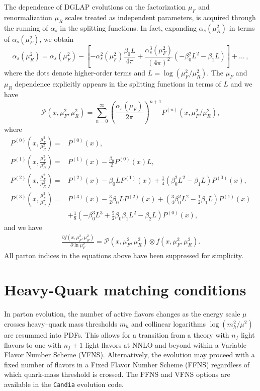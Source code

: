 \documentclass[12pt,notitlepage,aps,preprintnumbers,superscriptaddress,nofootinbib,aps,prd,floatfix]{revtex4-2}
\renewenvironment{eqnarray}{\begin{equation}\begin{aligned}}
{\end{aligned}\end{equation}}
\newcommand{\ddp}{\partial}
\begin{document}
The dependence of DGLAP evolutions on the factorization $\mu_F$ and renormalization $\mu_R$ scales treated as independent parameters, is acquired through the running of $\alpha_s$ in the splitting functions. In fact, expanding $\alpha_s(\mu_R^2)$ in terms of $\alpha_s(\mu_F^2)$, we obtain 
%
\begin{equation}
\alpha_s(\mu_R^2)=\alpha_s(\mu_F^2)-\left[-\alpha_s^2(\mu_F^2)\frac{\beta_0
L}{4\pi}
+\frac{\alpha_s^3(\mu_F^2)}{(4\pi)^2}(-\beta_0^2 L^2-\beta_1
L)\right] + \dots\,,
\end{equation}
%
where the dots denote higher-order terms and $L = \log(\mu_F^2/\mu_R^2)$. The $\mu_F$ and $\mu_R$ dependence explicitly appears in the splitting functions in terms of $L$ and we have 
%
\begin{equation}
\mathcal{P}(x,\mu_F^2,\mu_R^2) = \sum_{n=0}^{\infty} \left( \frac{\alpha_s(\mu_F)}{2\pi} \right)^{n+1} P^{(n)}(x, \mu_F^2/\mu_R^2),
\label{muR-muF-splitting}
\end{equation}
%
where
%
\begin{align}
P^{(0)} \left( x,\frac{\mu_F^2}{\mu_R^2} \right) =& P^{(0)}(x), 
\\
P^{(1)} \left( x,\frac{\mu_F^2}{\mu_R^2} \right) =& P^{(1)}(x) - \frac{\beta_0}{2}P^{(0)}(x)L,
\\
P^{(2)} \left( x,\frac{\mu_F^2}{\mu_R^2} \right) =& P^{(2)}(x) - \beta_0LP^{(1)}(x) + \frac{1}{4}(\beta_0^2L^2 - \beta_1L)P^{(0)}(x),
\\
P^{(3)} \left( x,\frac{\mu_F^2}{\mu_R^2} \right) =&  P^{(3)}(x) - \frac{3}{2}\beta_0LP^{(2)}(x) + \left( \frac{3}{4}\beta_0^2L^2 - \frac{1}{2}\beta_1L \right)P^{(1)}(x) \nonumber\\
&+ \frac{1}{8} \left( -\beta_0^3L^3 + \frac{5}{2}\beta_0\beta_1L^2 - \beta_2L \right)P^{(0)}(x),
\end{align}
and we have 
%
\begin{eqnarray}
  \frac{\ddp{f(x,\mu_F^2,\mu_R^2)}}{\ddp{\ln \mu_F^2}} = \mathcal{P}(x,\mu_F^2,\mu_R^2) \otimes f(x,\mu_F^2,\mu_R^2).
\end{eqnarray}
%
All parton indices in the equations above have been suppressed for simplicity. 
%
  



\section{Heavy-Quark matching conditions}
\label{threshold-cond}
In parton evolution, the number of active flavors changes as the energy scale $\mu$ crosses heavy–quark mass thresholds $m_h$ and collinear logarithms $\log(m_{h}^2/\mu^2)$ are resummed into PDFs. This allows for a transition from a theory with $n_f$ light flavors to one with $n_f+1$ light flavors at NNLO and beyond within a Variable Flavor Number Scheme (VFNS). Alternatively, the evolution may proceed with a fixed number of flavors in a Fixed Flavor Number Scheme (FFNS) regardless of which quark-mass threshold is crossed. The FFNS and VFNS options are available in the \texttt{Candia} evolution code. 
\end{document}
